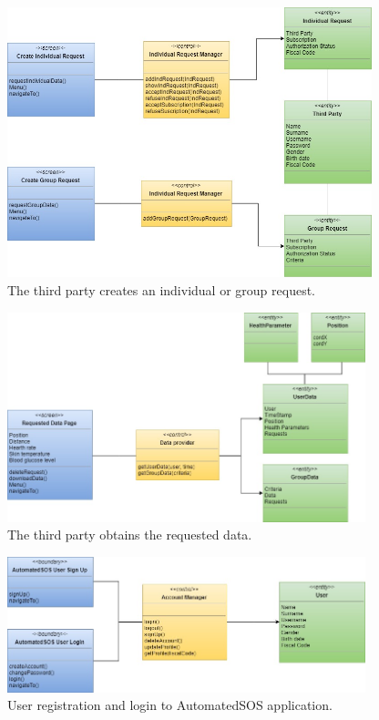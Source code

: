 \begin{figure}[ht]
    \centering
    \includegraphics[width=300pt]{images/BCE/BCE_Diagrams5.jpg}
    \caption{The third party creates an individual or group request.}
    \label{BCE5}
\end{figure}
\begin{figure}[ht]
    \centering
    \includegraphics[width=295pt]{images/BCE/BCE_Diagrams6.jpg}
    \caption{The third party obtains the requested data.}
    \label{BCE6}
\end{figure}
\begin{figure}[ht]
    \centering
    \includegraphics[width=295pt]{images/BCE/BCE_Diagrams7.jpg}
    \caption{User registration and login to AutomatedSOS application.}
    \label{BCE7}
\end{figure}
